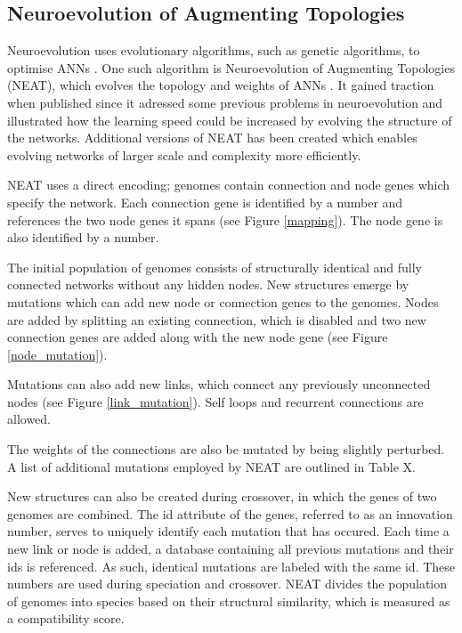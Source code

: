 \newpage

\subsection{Neuroevolution of Augmenting Topologies}
Neuroevolution uses evolutionary algorithms, such as genetic algorithms, to optimise ANNs \cite{neuroevolution_review}.
One such algorithm is Neuroevolution of Augmenting Topologies (NEAT), which evolves the topology and weights of ANNs \cite{neat_main, neat_short, neat_phd}.
It gained traction when published since it adressed some previous problems in neuroevolution and illustrated how the learning speed could
be increased by evolving the structure of the networks. Additional versions of NEAT has been created which enables evolving networks
of larger scale and complexity more efficiently.

NEAT uses a direct encoding; genomes contain connection and node genes which specify the network. Each connection gene is identified
by a number and references the two node genes it spans (see Figure \ref{mapping}). The node gene is also identified by a number.



The initial population of genomes consists of structurally identical and fully connected networks without any hidden nodes.
New structures emerge by mutations which can add new node or connection genes to the genomes. Nodes are added by splitting an existing
connection, which is disabled and two new connection genes are added along with the new node gene (see Figure \ref{node_mutation}).



Mutations can also add new links, which connect any previously unconnected nodes (see Figure \ref{link_mutation}).
Self loops and recurrent connections are allowed.

The weights of the connections are also be mutated by being slightly perturbed. A list of additional mutations employed by NEAT are outlined in Table X.



New structures can also be created during crossover, in which the genes of two genomes are combined.
The id attribute of the genes, referred to as an innovation number, serves to uniquely identify each mutation that has occured.
Each time a new link or node is added, a database containing all previous mutations and their ids is referenced.
As such, identical mutations are labeled with the same id.
These numbers are used during speciation and crossover. NEAT divides the population of genomes into species based on their structural
similarity, which is measured as a compatibility score.



